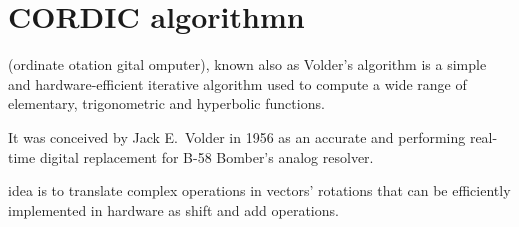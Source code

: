 \chapter{CORDIC algorithmn}\label{ch:algorithm}

\cordic{} (ordinate otation gital
omputer), known also as Volder's algorithm is a simple and
hardware-efficient iterative algorithm used to compute a wide range of
elementary, trigonometric and hyperbolic functions.

It was conceived by Jack E.\ Volder in 1956 as an accurate and performing
real-time digital replacement for B-58 Bomber's analog resolver.

\cordic{} idea is to translate complex operations in vectors' rotations that can
be efficiently implemented in hardware as shift and add operations.



